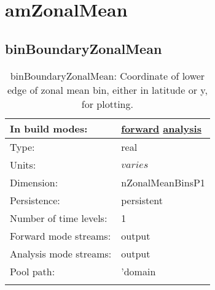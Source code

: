 \section[amZonalMean]{amZonalMean}
\label{sec:var_sec_amZonalMean}
\subsection[binBoundaryZonalMean]{binBoundaryZonalMean}
\label{subsec:var_sec_amZonalMean_binBoundaryZonalMean}
\begin{center}
\begin{longtable}{| p{2.0in} | p{4.0in} |}
        \hline 
        In build modes: & \hyperref[subsec:forward_var_tab_amZonalMean]{forward} \hyperref[subsec:analysis_var_tab_amZonalMean]{analysis} \\
        \hline 
        Type: & real \\
        \hline 
        Units: & $varies$ \\
        \hline 
        Dimension: & nZonalMeanBinsP1 \\
        \hline 
        Persistence: & persistent \\
        \hline 
        Number of time levels: & 1 \\
        \hline 
		 Forward mode streams: &  output \\
        \hline 
		 Analysis mode streams: &  output \\
        \hline 
            Pool path: & 'domain %
 \\
		 \hline 
    \caption{binBoundaryZonalMean: Coordinate of lower edge of zonal mean bin, either in latitude or y, for plotting.}
\end{longtable}
\end{center}
